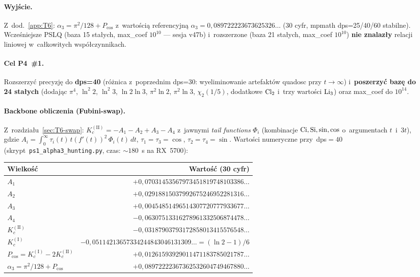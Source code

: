 \paragraph{Wyj\'scie.}
Z~dod.~\ref{app:T6}: $\alpha_3 = \pi^2/128 + P_{\cos}$ z~warto\'sci\k{a}
referencyjn\k{a} $\alpha_3 = 0{,}089722223673625326\ldots$
(30 cyfr, mpmath dps=25/40/60 stabilne).
Wcze\'sniejsze PSLQ (baza 15 sta\l{}ych, max\_coef $10^{10}$
--- sesja v47b) i~rozszerzone (baza 21 sta\l{}ych, max\_coef $10^{10}$)
\textbf{nie znalazły} relacji liniowej w~całkowitych wsp\'o\l{}czynnikach.

\paragraph{Cel P4~\#1.}
Rozszerzy\'c precyzj\k{e} do \textbf{dps=40} (r\'o\.znica z~poprzednim
dps=30: wyeliminowanie artefaktów quadosc przy $t \to \infty$)
i~\textbf{poszerzy\'c baz\k{e} do 24 sta\l{}ych} (dodaj\k{a}c $\pi^4$,
$\ln^2 2$, $\ln^2 3$, $\ln 2 \ln 3$, $\pi^2 \ln 2$, $\pi^2 \ln 3$,
$\chi_2(1/5)$, dodatkowe $\operatorname{Cl}_2$ i~trzy warto\'sci $\operatorname{Li}_3$)
oraz max\_coef do $10^{14}$.

\paragraph{Backbone obliczenia (Fubini-swap).}
Z~rozdzia\l{}u~\ref{sec:T6-swap}: $K_c^{(\mathrm{II})} = -A_1-A_2+A_3-A_4$
z~jawnymi \emph{tail functions} $\Phi_i$ (kombinacje $\operatorname{Ci}, \operatorname{Si}, \sin, \cos$
o~argumentach $t$~i~$3t$), gdzie $A_i = \int_0^\infty \tau_i(t)\,t(f'(t))^2\,\Phi_i(t)\,dt$,
$\tau_1=\tau_3=\cos$, $\tau_2=\tau_4=\sin$.
Warto\'sci numeryczne przy~dps$=40$ (skrypt~\texttt{ps1\_alpha3\_hunting.py},
czas: $\sim 180$~s na RX~5700):

\begin{center}\footnotesize
\begin{tabular}{@{}lr@{}}
\toprule
Wielko\'s\'c & Warto\'s\'c (30 cyfr) \\
\midrule
$A_1$ & $+0{,}07031453567973451819748103386\ldots$ \\
$A_2$ & $+0{,}02918815037992675246952281316\ldots$ \\
$A_3$ & $+0{,}00454851496514307720777933677\ldots$ \\
$A_4$ & $-0{,}06307513316278961332506874478\ldots$ \\
$K_c^{(\mathrm{II})}$ & $-0{,}03187903793172858013415576548\ldots$ \\
$K_c^{(\mathrm{I})}$ & $-0{,}05114213657334244843046131309\ldots = (\ln 2 - 1)/6$ \\
$P_{\cos}=K_c^{(\mathrm{I})}-2K_c^{(\mathrm{II})}$ & $+0{,}01261593929011471183785021787\ldots$ \\
$\alpha_3 = \pi^2/128 + P_{\cos}$ & $+0{,}08972222367362532604749467880\ldots$ \\
\bottomrule
\end{tabular}
\end{center}


